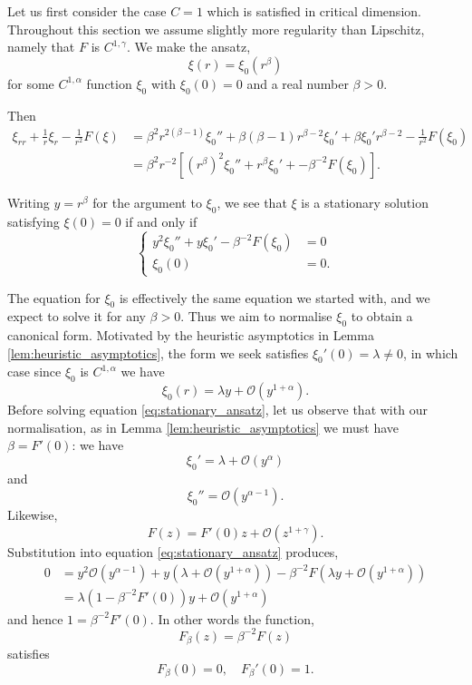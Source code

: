 \documentclass{amsart}
\begin{document}
Let us first consider the case \(C = 1\) which is satisfied in critical dimension. Throughout this section we assume slightly more regularity than Lipschitz, namely that \(F\) is \(C^{1,\gamma}\). We make the ansatz,
\[
\xi(r) = \xi_0(r^{\beta})
\]
for some \(C^{1,\alpha}\) function \(\xi_0\) with \(\xi_0(0) = 0\) and a real number \(\beta > 0\).

Then
\[
\begin{split}
\xi_{rr} + \frac{1}{r} \xi_r - \frac{1}{r^2} F(\xi) &= \beta^2 r^{2(\beta-1)} \xi_0'' + \beta (\beta - 1) r^{\beta-2} \xi_0' + \beta \xi_0' r^{\beta-2} - \frac{1}{r^2} F(\xi_0) \\
&= \beta^2 r^{-2} \left[(r^{\beta})^2 \xi_0'' + r^{\beta} \xi_0' + - \beta^{-2}F(\xi_0)\right].
\end{split}
\]

Writing \(y = r^{\beta}\) for the argument to \(\xi_0\), we see that \(\xi\) is a stationary solution satisfying \(\xi(0) = 0\) if and only if
\begin{equation}
\label{eq:stationary_ansatz}
\begin{cases}
y^2 \xi_0'' + y \xi_0' - \beta^{-2} F(\xi_0) &= 0 \\
\xi_0(0) &= 0.
\end{cases}
\end{equation}

The equation for \(\xi_0\) is effectively the same equation we started with, and we expect to solve it for any \(\beta > 0\). Thus we aim to normalise \(\xi_0\) to obtain a canonical form. Motivated by the heuristic asymptotics in Lemma \ref{lem:heuristic_asymptotics}, the form we seek satisfies \(\xi_0'(0) = \lambda \ne 0\), in which case since \(\xi_0\) is \(C^{1,\alpha}\) we have
\[
\xi_0(r) = \lambda y + \mathcal{O}(y^{1+\alpha}).
\]
Before solving equation \eqref{eq:stationary_ansatz}, let us observe that with our normalisation, as in Lemma \ref{lem:heuristic_asymptotics} we must have \(\beta = F'(0)\): we have
\[
\xi_0' = \lambda + \mathcal{O} (y^{\alpha})
\]
and
\[
\xi_0'' = \mathcal{O} (y^{\alpha-1}).
\]
Likewise,
\[
F(z) = F'(0) z + \mathcal{O}(z^{1+\gamma}).
\]
Substitution into equation \eqref{eq:stationary_ansatz} produces,
\[
\begin{split}
0 &= y^2 \mathcal{O}(y^{\alpha-1}) + y \left(\lambda + \mathcal{O}(y^{1+\alpha})\right) - \beta^{-2} F(\lambda y + \mathcal{O} (y^{1 + \alpha})) \\
&= \lambda(1 - \beta^{-2} F'(0)) y + \mathcal{O}(y^{1+\alpha})
\end{split}
\]
and hence \(1 = \beta^{-2} F'(0)\). In other words the function,
\[
F_{\beta}(z) = \beta^{-2} F(z)
\]
satisfies
\[
F_{\beta} (0) = 0, \quad F_{\beta}'(0) = 1.
\]
\end{document}

